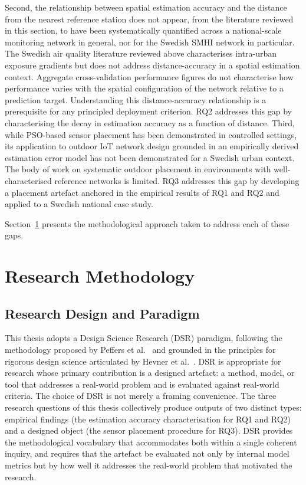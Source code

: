 \documentclass[11pt,a4paper]{article}
\let\oldsection\section
\renewcommand{\section}{\FloatBarrier\oldsection}
\let\oldsubsection\subsection
\renewcommand{\subsection}{\FloatBarrier\oldsubsection}
\begin{document}
Second, the relationship between spatial estimation accuracy and the distance from the nearest reference station does not appear, from the literature reviewed in this section, to have been systematically quantified across a national-scale monitoring network in general, nor for the Swedish SMHI network in particular. The Swedish air quality literature reviewed above \cite{segersson_sweden_health_2017, sweden_dispersion_2024} characterises intra-urban exposure gradients but does not address distance-accuracy in a spatial estimation context. Aggregate cross-validation performance figures do not characterise how performance varies with the spatial configuration of the network relative to a prediction target. Understanding this distance-accuracy relationship is a prerequisite for any principled deployment criterion. RQ2 addresses this gap by characterising the decay in estimation accuracy as a function of distance.
Third, while PSO-based sensor placement has been demonstrated in controlled settings, its application to outdoor IoT network design grounded in an empirically derived estimation error model has not been demonstrated for a Swedish urban context. The body of work on systematic outdoor placement in environments with well-characterised reference networks is limited. RQ3 addresses this gap by developing a placement artefact anchored in the empirical results of RQ1 and RQ2 and applied to a Swedish national case study.

Section~\ref{sec:methodology} presents the methodological approach taken to address each of these gaps.

\section{Research Methodology}
\label{sec:methodology}

\subsection{Research Design and Paradigm}
\label{sec:dsr-paradigm}

This thesis adopts a Design Science Research (DSR) paradigm, following the methodology proposed by Peffers et al.\ \cite{peffers_dsr_2007} and grounded in the principles for rigorous design science articulated by Hevner et al.\ \cite{hevner_design_science_2004}. DSR is appropriate for research whose primary contribution is a designed artefact: a method, model, or tool that addresses a real-world problem and is evaluated against real-world criteria. The choice of DSR is not merely a framing convenience. The three research questions of this thesis collectively produce outputs of two distinct types: empirical findings (the estimation accuracy characterisation for RQ1 and RQ2) and a designed object (the sensor placement procedure for RQ3). DSR provides the methodological vocabulary that accommodates both within a single coherent inquiry, and requires that the artefact be evaluated not only by internal model metrics but by how well it addresses the real-world problem that motivated the research.
\end{document}
